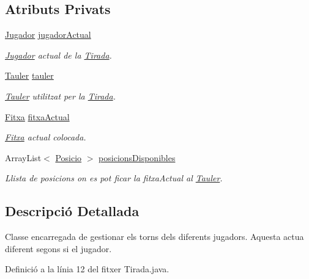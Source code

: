 \subsection*{Atributs Privats}
\begin{DoxyCompactItemize}
\item 
\mbox{\hyperlink{class_jugador}{Jugador}} \mbox{\hyperlink{class_tirada_a73b6b0d485f45af265828f0d1db8070d}{jugador\+Actual}}
\begin{DoxyCompactList}\small\item\em \mbox{\hyperlink{class_jugador}{Jugador}} actual de la \mbox{\hyperlink{class_tirada}{Tirada}}. \end{DoxyCompactList}\item 
\mbox{\hyperlink{class_tauler}{Tauler}} \mbox{\hyperlink{class_tirada_a861054c4b90f8b27698610e0e3b5ad46}{tauler}}
\begin{DoxyCompactList}\small\item\em \mbox{\hyperlink{class_tauler}{Tauler}} utilitzat per la \mbox{\hyperlink{class_tirada}{Tirada}}. \end{DoxyCompactList}\item 
\mbox{\hyperlink{class_fitxa}{Fitxa}} \mbox{\hyperlink{class_tirada_a22a1439b7888810b998f1f6a30990a36}{fitxa\+Actual}}
\begin{DoxyCompactList}\small\item\em \mbox{\hyperlink{class_fitxa}{Fitxa}} actual colocada. \end{DoxyCompactList}\item 
Array\+List$<$ \mbox{\hyperlink{class_posicio}{Posicio}} $>$ \mbox{\hyperlink{class_tirada_aaccd3106612026e374b9c2cb769aca12}{posicions\+Disponibles}}
\begin{DoxyCompactList}\small\item\em Llista de posicions on es pot ficar la fitxa\+Actual al \mbox{\hyperlink{class_tauler}{Tauler}}. \end{DoxyCompactList}\end{DoxyCompactItemize}


\subsection{Descripció Detallada}
Classe encarregada de gestionar els torns dels diferents jugadors. Aquesta actua diferent segons si el jugador. 

Definició a la línia 12 del fitxer Tirada.\+java.




